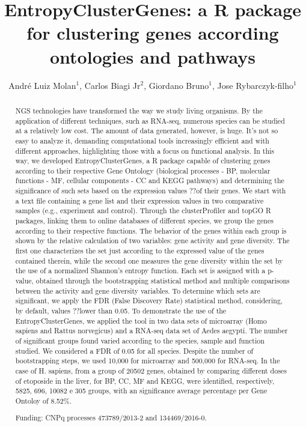 \documentclass[twoside]{article}
\title{\vspace{-15mm}\fontsize{24pt}{10pt}\selectfont\textbf{EntropyClusterGenes: a R package for clustering genes according ontologies and pathways}} %
\author{Andr\'e Luiz Molan$^1$, Carlos Biagi Jr$^2$, Giordano Bruno$^1$, Jose Rybarczyk-filho$^1$}
\affil{1 UNESP\\ 2 UNESP - BOTUCATU/SP\\ }
\date{}
\begin{document}
\maketitle %

\thispagestyle{fancy} %


\begin{abstract}
NGS technologies have transformed the way we study living organisms. By the application of different techniques, such as RNA-seq, numerous species can be studied at a relatively low cost. The amount of data generated, however, is huge. It's not so easy to analyze it, demanding computational tools increasingly efficient and with different approaches, highlighting those with a focus on functional analysis. In this way, we developed EntropyClusterGenes, a R package capable of clustering genes according to their respective Gene Ontology (biological processes - BP, molecular functions - MF, cellular components - CC and KEGG pathways) and determining the significance of such sets based on the expression values ??of their genes. We start with a text file containing a gene list and their expression values in two comparative samples (e.g., experiment and control). Through the clusterProfiler and topGO R packages, linking them to online databases of different species, we group the genes according to their respective functions. The behavior of the genes within each group is shown by the relative calculation of two variables: gene activity and gene diversity. The first one characterizes the set just according to the expressed value of the genes contained therein, while the second one measures the gene diversity within the set by the use of a normalized Shannon's entropy function. Each set is assigned with a p-value, obtained through the bootstrapping statistical method and multiple comparisons between the activity and gene diversity variables. To determine which sets are significant, we apply the FDR (False Discovery Rate) statistical method, considering, by default, values ??lower than 0.05. To demonstrate the use of the EntropyClusterGenes, we applied the tool in two data sets of microarray (Homo sapiens and Rattus norvegicus) and a RNA-seq data set of Aedes aegypti. The number of significant groups found varied according to the species, sample and function studied. We considered a FDR of 0.05 for all species. Despite the number of bootstrapping steps, we used 10,000 for microarray and 500,000 for RNA-seq. In the case of H. sapiens, from a group of 20502 genes, obtained by comparing different doses of etoposide in the liver, for BP, CC, MF and KEGG, were identified, respectively,  5825, 696, 10082 e 305 groups, with an significance average percentage per Gene Ontoloy of 8.52\%.

Funding: CNPq processes 473789/2013-2 and 134469/2016-0.
\end{abstract}
\end{document}
